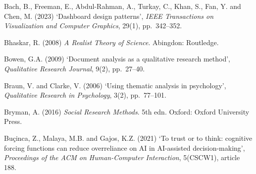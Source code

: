 \documentclass[11pt,a4paper]{article}
\numberwithin{figure}{section}
\numberwithin{table}{section}
\begin{document}
{\noindent\hypertarget{ref7}{}\begin{minipage}[t]{\dimexpr\linewidth-1.05cm\relax}Bach, B., Freeman, E., Abdul-Rahman, A., Turkay, C., Khan, S., Fan, Y. and Chen, M. (2023) `Dashboard design patterns', \emph{IEEE Transactions on Visualization and Computer Graphics}, 29(1), pp.~342--352.\end{minipage}\par\vspace{4pt}
\noindent\hypertarget{ref8}{}\begin{minipage}[t]{\dimexpr\linewidth-1.05cm\relax}Bhaskar, R. (2008) \emph{A Realist Theory of Science}. Abingdon: Routledge.\end{minipage}\par\vspace{4pt}
\noindent\hypertarget{ref9}{}\begin{minipage}[t]{\dimexpr\linewidth-1.05cm\relax}Bowen, G.A. (2009) `Document analysis as a qualitative research method', \emph{Qualitative Research Journal}, 9(2), pp.~27--40.\end{minipage}\par\vspace{4pt}
\noindent\hypertarget{ref10}{}\begin{minipage}[t]{\dimexpr\linewidth-1.05cm\relax}Braun, V. and Clarke, V. (2006) `Using thematic analysis in psychology', \emph{Qualitative Research in Psychology}, 3(2), pp.~77--101.\end{minipage}\par\vspace{4pt}
\noindent\hypertarget{ref11}{}\begin{minipage}[t]{\dimexpr\linewidth-1.05cm\relax}Bryman, A. (2016) \emph{Social Research Methods}. 5th edn. Oxford: Oxford University Press.\end{minipage}\par\vspace{4pt}
\noindent\hypertarget{ref12}{}\begin{minipage}[t]{\dimexpr\linewidth-1.05cm\relax}Bu\c{c}inca, Z., Malaya, M.B. and Gajos, K.Z. (2021) `To trust or to think: cognitive forcing functions can reduce overreliance on AI in AI-assisted decision-making', \emph{Proceedings of the ACM on Human-Computer Interaction}, 5(CSCW1), article 188.\end{minipage}\par\vspace{4pt}
}
\end{document}
